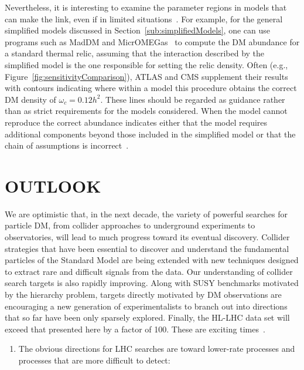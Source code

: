 \documentclass{ar-1col}
\begin{document}
{Nevertheless, it is interesting to
examine the parameter regions in models that can make the link, even if in limited
situations~\cite{Busoni:2014gta,Catena:2017xqq}. For example, for
the general simplified models discussed in
Section~\ref{sub:simplifiedModels}, one can use programs
such as MadDM and
MicrOMEGas~\cite{Backovic:2015cra,Barducci:2016pcb} to compute  the DM
abundance for a standard thermal relic, assuming that the
interaction described by the simplified model is the one
responsible for setting the relic density. Often (e.g.,
Figure~\ref{fig:sensitivityComparison}), ATLAS and CMS supplement
their results with contours indicating where within a model this
procedure obtains the correct DM density of $\omega_c =
0.12 h^2$. These lines should be regarded as guidance rather than as strict
requirements for the models considered. 
When the model cannot reproduce the correct abundance indicates either that  the model requires additional
components beyond those included in the simplified model or that
the chain of assumptions is incorrect~\cite{Bernal:2017kxu}.

\section{OUTLOOK}\label{sec:05_Future}

We are optimistic that, in the next decade, the variety of powerful searches for
particle DM, from collider approaches to underground
experiments to observatories, will lead to much progress toward its eventual discovery.
Collider strategies that have been essential to discover and understand the fundamental particles
of the Standard Model are being extended with new techniques designed to extract rare and difficult
signals from the data. Our understanding of
collider search targets is also rapidly improving. Along with SUSY
benchmarks motivated by the hierarchy problem, targets directly
motivated by DM observations are encouraging a new generation of
experimentalists to branch out into directions that so far have been only
sparsely explored. Finally, the HL-LHC data set will exceed that presented here by a factor of 100. These
are exciting times~\cite{Steigman:1979kw}.

\begin{issues}
 \begin{enumerate} 

\item The obvious directions for LHC searches are toward lower-rate
processes and processes that are more difficult to detect:


\end{enumerate}
\end{issues}}
\end{document}
